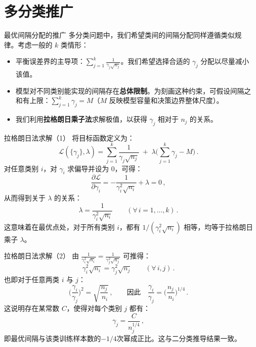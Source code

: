 \documentclass{beamer}
\begin{document}
\section{多分类推广}
\begin{frame}{最优间隔分配的推广}
    多分类问题中，我们希望类间的间隔分配同样遵循类似规律。考虑一般的 $k$ 类情形：
    \begin{itemize}
        \item 平衡误差界的主导项：$\sum_{j=1}^k \frac{1}{\gamma_j\sqrt{n_j}}$。我们希望选择合适的 $\gamma_j$ 分配以尽量减小该值。
        \item 模型对不同类别能实现的间隔存在\textbf{总体限制}。为刻画这种约束，可假设间隔之和有上限：$\sum_{j=1}^k \gamma_j = M$（$M$ 反映模型容量和决策边界整体尺度）。
        \item 我们利用\textbf{拉格朗日乘子法}求解极值，以获得 $\gamma_j$ 相对于 $n_j$ 的关系。
    \end{itemize}
\end{frame}

\begin{frame}{拉格朗日法求解（1）}
    将目标函数定义为：
    \[
        \mathcal{L}(\{\gamma_j\}, \lambda) = \sum_{j=1}^k \frac{1}{\gamma_j\sqrt{n_j}}\;+\; \lambda\Big(\sum_{j=1}^k \gamma_j - M\Big)\,.
    \]
    对任意类别 $i$，对 $\gamma_i$ 求偏导并设为 0，可得：
    \[
        \frac{\partial \mathcal{L}}{\partial \gamma_i} = -\frac{1}{\gamma_i^2 \sqrt{n_i}} + \lambda = 0\,,
    \] 
    从而得到关于 $\lambda$ 的关系：
    \[
        \lambda = \frac{1}{\gamma_i^2\sqrt{n_i}}\qquad (\forall\,i=1,\dots,k)\,.
    \]
    这意味着在最优点处，对于所有类别 $i$，都有 $1/(\gamma_i^2\sqrt{n_i})$ 相等，均等于拉格朗日乘子 $\lambda$。
\end{frame}

\begin{frame}{拉格朗日法求解（2）}
    由 $\displaystyle \frac{1}{\gamma_i^2\sqrt{n_i}} = \frac{1}{\gamma_j^2\sqrt{n_j}}$ 可推得：
    \[
        \gamma_i^2 \sqrt{n_i} = \gamma_j^2 \sqrt{n_j} \qquad (\forall\, i,j)\,.
    \]
    也即对于任意两类 $i$ 与 $j$：
    \[
        \Big(\frac{\gamma_i}{\gamma_j}\Big)^2 = \sqrt{\frac{n_j}{\,n_i}}\,, \qquad \text{因此}\quad \frac{\gamma_i}{\gamma_j} = \Big(\frac{n_j}{\,n_i}\Big)^{1/4}\,.
    \]
    这说明存在某常数 $C$，使得对每个类别 $j$ 都有：
    \[
        \gamma_j = \frac{C}{n_j^{1/4}}\,,
    \] 
    即最优间隔与该类训练样本数的$-1/4$次幂成正比。这与二分类推导结果一致。
\end{frame}
\end{document}
